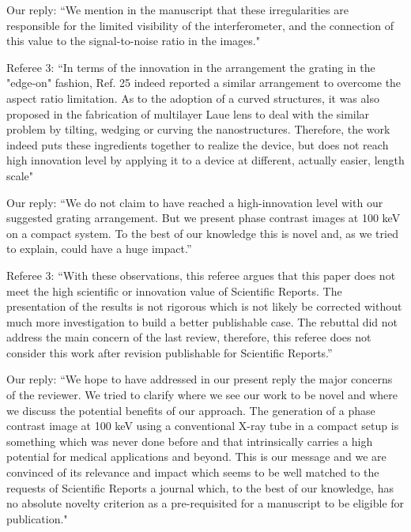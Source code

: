 \documentclass[a4paper,english]{scrartcl} \usepackage[detect-all]{siunitx}
\begin{document}
Our reply: “We mention in the manuscript that these irregularities are
responsible for the limited visibility of the interferometer, and the
connection of this value to the signal-to-noise ratio in the images."

Referee 3: “In terms of the innovation in the arrangement the grating in the
"edge-on" fashion, Ref. 25 indeed reported a similar arrangement to overcome
the aspect ratio limitation. As to the adoption of a curved structures, it
was also proposed in the fabrication of multilayer Laue lens to deal with
the similar problem by tilting, wedging or curving the nanostructures.
Therefore, the work indeed puts these ingredients together to realize the
device, but does not reach high innovation level by applying it to a device
at different, actually easier, length scale"

Our reply: “We do not claim to have reached a high-innovation level with our
suggested grating arrangement. But we present  phase contrast images at 100
keV on a compact system. To the best of our knowledge this is novel and, as
we tried to explain, could have a huge impact.”

Referee 3: “With these observations, this referee argues that this paper
does not meet the high scientific or innovation value of Scientific Reports.
The presentation of the results is not rigorous which is not likely be
corrected without much more investigation to build a better publishable
case. The rebuttal did not address the main concern of the last review,
therefore, this referee does not consider this work after revision
publishable for Scientific Reports.”

Our reply: “We hope to have addressed in our present reply the major
concerns of the reviewer. We tried to clarify where we see our work to be
novel and where we discuss the potential benefits of our approach. The
generation of a phase contrast image at 100 keV using a conventional X-ray
tube in a compact setup is something which was never done before and that
intrinsically carries a high potential for medical applications and beyond.
This is our message and we are convinced of its relevance and impact which
seems to be well matched to the requests of Scientific Reports a journal
which, to the best of our knowledge, has no absolute novelty criterion as a
pre-requisited for a manuscript to be eligible for publication."
\end{document}
